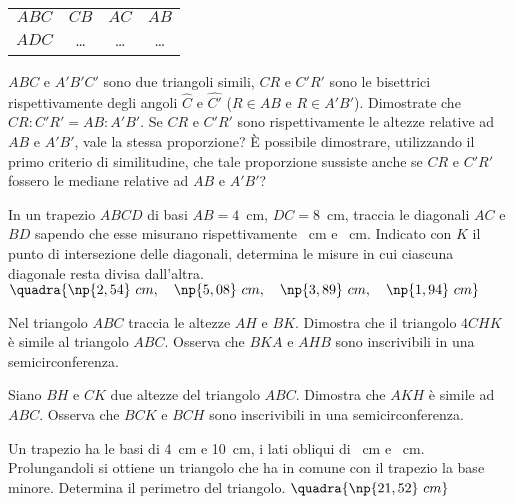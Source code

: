 \begin{multicols}{2}
\begin{esercizio}
\begin{center}
\begin{tabular}{cccc}
\toprule
$ABC$ & $CB$ & $AC$ & $AB$\\
$ADC$ & \ldots{} & \ldots{} & \ldots{}\\
\bottomrule
\end{tabular}
\end{center}
\end{esercizio}

\begin{esercizio}
\label{ese:6.63}
$ABC$ e $A'B'C'$ sono due triangoli simili, $CR$ e $C'R'$ sono le 
bisettrici rispettivamente degli angoli $\widehat{C}$ e 
$\widehat{C'}$ ($R\in AB$ e $R\in A'B'$). Dimostrate che $CR : C'R' = 
AB : A'B'$. Se $CR$ e $C'R'$ sono rispettivamente le altezze relative 
ad $AB$ e $A'B'$, vale la stessa proporzione? È possibile 
dimostrare, utilizzando il primo criterio di similitudine, che tale 
proporzione sussiste anche se $CR$ e $C'R'$ fossero le mediane 
relative ad $AB$ e $A'B'$?
\end{esercizio}

\begin{esercizio}
\label{ese:6.64}
In un trapezio $ABCD$ di basi $AB=4$~cm, $DC=8$~cm, traccia le 
diagonali $AC$ e $BD$ sapendo che esse misurano rispettivamente 
~cm e ~cm. Indicato con $K$ il punto di 
intersezione delle diagonali, determina le misure in cui ciascuna 
diagonale resta divisa dall'altra. 
\hfill$\quadra{\np{2,54}~cm,\quad \np{5,08}~cm,\quad \np{3,89}~cm,\quad 
\np{1,94}~cm}$
\end{esercizio}

\begin{esercizio}
\label{ese:6.65}
Nel triangolo $ABC$ traccia le altezze $AH$ e $BK$. Dimostra che il 
triangolo $4CHK$ è simile al triangolo $ABC$. Osserva che $BKA$ e 
$AHB$ sono inscrivibili in una semicirconferenza.
\end{esercizio}

\begin{esercizio}
\label{ese:6.66}
Siano $BH$ e $CK$ due altezze del triangolo $ABC$. Dimostra che $AKH$ 
è simile ad $ABC$. Osserva che $BCK$ e $BCH$ sono inscrivibili in una 
semicirconferenza.
\end{esercizio}

\begin{esercizio}
\label{ese:6.67}
Un trapezio ha le basi di 4~cm e 10~cm, i lati obliqui di 
~cm e ~cm. Prolungandoli si ottiene un triangolo che 
ha in comune con il trapezio la base minore. Determina il perimetro 
del triangolo. 
\hfill$\quadra{\np{21,52}~cm}$
\end{esercizio}


\end{multicols}
